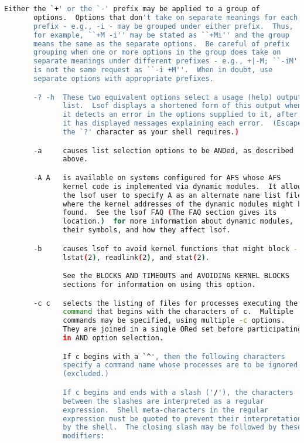 {{\begin{lstlisting}[language=bash]
       Either the `+' or the `-' prefix may be applied to a group of
       options.  Options that don't take on separate meanings for each
       prefix - e.g., -i - may be grouped under either prefix.  Thus,
       for example, ``+M -i'' may be stated as ``+Mi'' and the group
       means the same as the separate options.  Be careful of prefix
       grouping when one or more options in the group does take on
       separate meanings under different prefixes - e.g., +|-M; ``-iM''
       is not the same request as ``-i +M''.  When in doubt, use
       separate options with appropriate prefixes.

       -? -h  These two equivalent options select a usage (help) output
              list.  Lsof displays a shortened form of this output when
              it detects an error in the options supplied to it, after
              it has displayed messages explaining each error.  (Escape
              the `?' character as your shell requires.)

       -a     causes list selection options to be ANDed, as described
              above.

       -A A   is available on systems configured for AFS whose AFS
              kernel code is implemented via dynamic modules.  It allows
              the lsof user to specify A as an alternate name list file
              where the kernel addresses of the dynamic modules might be
              found.  See the lsof FAQ (The FAQ section gives its
              location.)  for more information about dynamic modules,
              their symbols, and how they affect lsof.

       -b     causes lsof to avoid kernel functions that might block -
              lstat(2), readlink(2), and stat(2).

              See the BLOCKS AND TIMEOUTS and AVOIDING KERNEL BLOCKS
              sections for information on using this option.

       -c c   selects the listing of files for processes executing the
              command that begins with the characters of c.  Multiple
              commands may be specified, using multiple -c options.
              They are joined in a single ORed set before participating
              in AND option selection.

              If c begins with a `^', then the following characters
              specify a command name whose processes are to be ignored
              (excluded.)

              If c begins and ends with a slash ('/'), the characters
              between the slashes are interpreted as a regular
              expression.  Shell meta-characters in the regular
              expression must be quoted to prevent their interpretation
              by the shell.  The closing slash may be followed by these
              modifiers:


\end{lstlisting}}}
